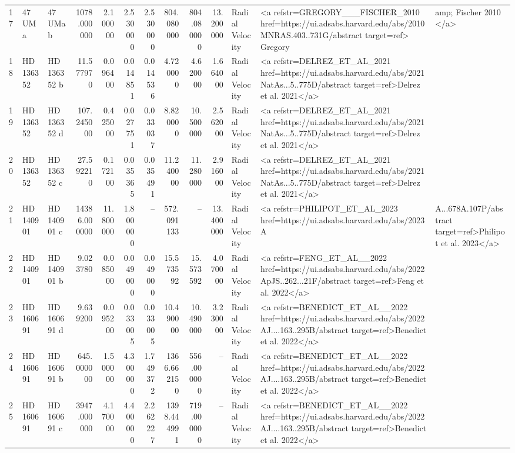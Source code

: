 \begin{tabular}{lllrrrrrrrll}
17 & 47 UMa & 47 UMa b & 1078.000000 & 2.100000 & 2.530000 & 2.530000 & 804.080000 & 804.080000 & 13.200000 & Radial Velocity & <a refstr=GREGORY___FISCHER_2010 href=https://ui.adsabs.harvard.edu/abs/2010MNRAS.403..731G/abstract target=ref> Gregory &amp; Fischer 2010 </a> \\
18 & HD 136352 & HD 136352 b & 11.577970 & 0.096400 & 0.014851 & 0.014536 & 4.720000 & 4.620000 & 1.664000 & Radial Velocity & <a refstr=DELREZ_ET_AL_2021 href=https://ui.adsabs.harvard.edu/abs/2021NatAs...5..775D/abstract target=ref>Delrez et al. 2021</a> \\
19 & HD 136352 & HD 136352 d & 107.245000 & 0.425000 & 0.027751 & 0.033037 & 8.820000 & 10.500000 & 2.562000 & Radial Velocity & <a refstr=DELREZ_ET_AL_2021 href=https://ui.adsabs.harvard.edu/abs/2021NatAs...5..775D/abstract target=ref>Delrez et al. 2021</a> \\
20 & HD 136352 & HD 136352 c & 27.592210 & 0.172100 & 0.035365 & 0.035491 & 11.240000 & 11.280000 & 2.916000 & Radial Velocity & <a refstr=DELREZ_ET_AL_2021 href=https://ui.adsabs.harvard.edu/abs/2021NatAs...5..775D/abstract target=ref>Delrez et al. 2021</a> \\
21 & HD 140901 & HD 140901 c & 14386.000000 & 11.800000 & 1.800000 & -- & 572.091133 & -- & 13.400000 & Radial Velocity & <a refstr=PHILIPOT_ET_AL_2023 href=https://ui.adsabs.harvard.edu/abs/2023A&A...678A.107P/abstract target=ref>Philipot et al. 2023</a> \\
22 & HD 140901 & HD 140901 b & 9.023780 & 0.085000 & 0.049000 & 0.049000 & 15.573592 & 15.573592 & 4.070000 & Radial Velocity & <a refstr=FENG_ET_AL__2022 href=https://ui.adsabs.harvard.edu/abs/2022ApJS..262...21F/abstract target=ref>Feng et al. 2022</a> \\
23 & HD 160691 & HD 160691 d & 9.639200 & 0.095200 & 0.033005 & 0.033005 & 10.490000 & 10.490000 & 3.230000 & Radial Velocity & <a refstr=BENEDICT_ET_AL__2022 href=https://ui.adsabs.harvard.edu/abs/2022AJ....163..295B/abstract target=ref>Benedict et al. 2022</a> \\
24 & HD 160691 & HD 160691 b & 645.000000 & 1.500000 & 4.300000 & 1.749372 & 1366.662150 & 556.000000 & -- & Radial Velocity & <a refstr=BENEDICT_ET_AL__2022 href=https://ui.adsabs.harvard.edu/abs/2022AJ....163..295B/abstract target=ref>Benedict et al. 2022</a> \\
25 & HD 160691 & HD 160691 c & 3947.000000 & 4.170000 & 4.400000 & 2.262227 & 1398.444991 & 719.000000 & -- & Radial Velocity & <a refstr=BENEDICT_ET_AL__2022 href=https://ui.adsabs.harvard.edu/abs/2022AJ....163..295B/abstract target=ref>Benedict et al. 2022</a> \\

\end{tabular}
